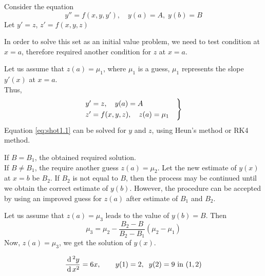 \documentclass[../main-sheet.tex]{subfiles}
\begin{document}
\begin{note}
    Consider the equation
    \[y''=f(x,y,y'),\quad y(a)=A,\;y(b)=B\]
    Let \(y'=z\), \(z'=f(x,y,z)\)

    In order to solve this set as an initial value problem, we need to test condition at \(x=a\), therefore required another condition for \(z\) at \(x=a\).

    Let us assume that \(z(a)=\mu_1\), where \(\mu_1\) is a guess, \(\mu_1\) represents the slope \(y'(x)\) at \(x=a\).\\
    Thus,
    \begin{equation}
        \begin{rcases}
            y'=z,\quad y(a)=A\quad\\
            z'=f(x,y,z),\quad z(a)=\mu_1\quad\\
        \end{rcases}
        \label{eq:shot1.1}
    \end{equation}
    Equation \eqref{eq:shot1.1} can be solved for \(y\) and \(z\), using Heun's method or RK4 method.

    If \(B=B_1\), the obtained required solution.\\
    If \(B\neq B_1\), the require another guess \(z(a)=\mu_2\). Let the new estimate of \(y(x)\) at \(x=b\) be \(B_2\). If \(B_2\) is not equal to \(B\), then the process may be continued until we obtain the correct estimate of \(y(b)\). However, the procedure can be accepted by using an improved guess for \(z(a)\) after estimate of \(B_1\) and \(B_2\).

    Let us assume that \(z(a)=\mu_3\) leads to the value of \(y(b)=B\). Then
    \[\mu_3=\mu_2-\frac{B_2-B}{B_2-B_1}(\mu_2-\mu_1)\]
    Now, \(z(a)=\mu_3\), we get the solution of \(y(x)\).
\end{note}
\begin{ex}
    \[\frac{\,\mathrm{d}\,^2 y}{\,\mathrm{d}\, x^2}=6x,\qquad y(1)=2,\;\;y(2)=9 \text{ in } (1,2)\]
\end{ex}
\end{document}
